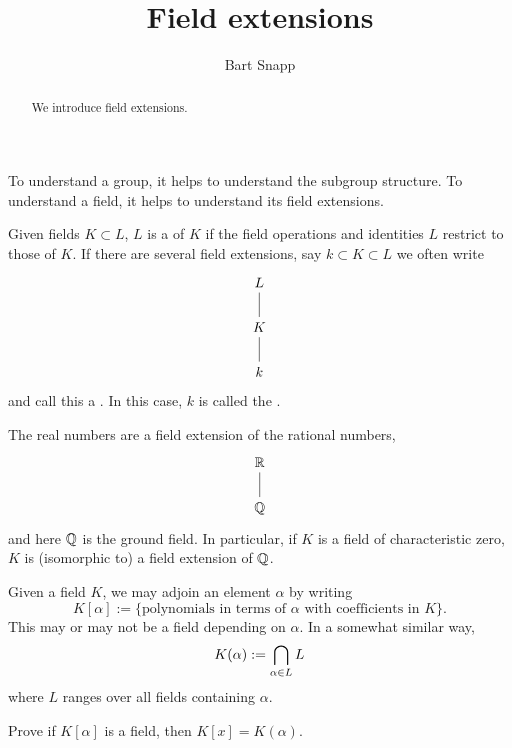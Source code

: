\documentclass{ximera}
\author{Bart Snapp}
\title{Field extensions}
\begin{document}
\begin{abstract}
  We introduce field extensions.
\end{abstract}
\maketitle

To understand a group, it helps to understand the subgroup
structure. To understand a field, it helps to understand its field
extensions.


\begin{definition}
  Given fields $K\subset L$, $L$ is a  of $K$ if
  the field operations and identities $L$ restrict to those of $K$. If
  there are several field extensions, say $k \subset K \subset L$ we
  often write
  \[
  \begin{tikzcd}
    L\ar[d,-] \\
    K \ar[d,-]\\
    k
  \end{tikzcd}
  \]
  and call this a . In this case, $k$ is called the .
\end{definition}

\begin{example}
  The real numbers are a field extension of the rational numbers,
  \[
  \begin{tikzcd}
    \R\ar[d,-] \\
    \Q
  \end{tikzcd}
  \]
  and here $\mathbb Q$ is the ground field. In particular, if $K$ is a field
  of characteristic zero, $K$ is (isomorphic to) a field extension of $\mathbb Q$.
\end{example}



\begin{example}
  Given a field $K$, we may adjoin an element $\alpha$ by writing
  \[
  K[\alpha] :=\{\text{polynomials in terms of $\alpha$ with
    coefficients in $K$}\}.
  \]
  This may or may not be a field depending on $\alpha$. In a somewhat
  similar way,
  \[
  K(\alpha) := \bigcap_{\alpha \in L} L\index{K(alpha)@$K(\alpha)$}
  \]
  where $L$ ranges over all fields containing $\alpha$.
\end{example}

\begin{exercise}
  Prove if $K[\alpha]$ is a field, then $K[x] = K(\alpha)$.
\end{exercise}
\end{document}

